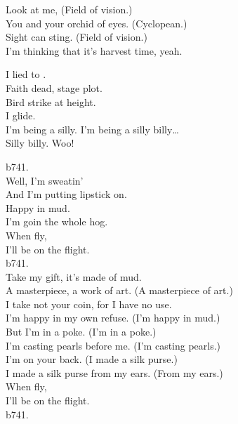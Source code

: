 Look at me, (Field of vision.) \\
You and your orchid of eyes. (Cyclopean.) \\
Sight can sting. (Field of vision.) \\
I'm thinking that it's harvest time, yeah. \\


I lied to . \\
Faith dead, stage plot. \\
Bird strike at height. \\
I glide. \\

I'm being a silly. I'm being a silly billy… \\
Silly billy. Woo! \\




b741. \\

Well, I'm sweatin' \\
And I'm putting lipstick on. \\
Happy in mud. \\
I'm goin the whole hog. \\

When  fly, \\
I'll be on the flight. \\
b741. \\

Take my gift, it's made of mud. \\
A masterpiece, a work of art. (A masterpiece of art.) \\
I take not your coin, for I have no use. \\
I'm happy in my own refuse. (I'm happy in mud.) \\
But I'm in a poke. (I'm in a poke.) \\
I'm casting pearls before me. (I'm casting pearls.) \\
I'm on your back. (I made a silk purse.) \\
I made a silk purse from my ears. (From my ears.) \\

When  fly, \\
I'll be on the flight. \\
b741. \\

